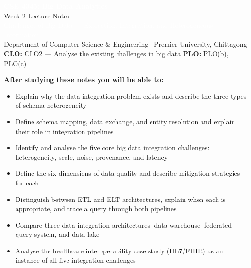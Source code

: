 \documentclass[12pt,a4paper]{article}
\begin{document}

\noindent
\colorbox{PUNavy}{%
  \begin{minipage}{\linewidth}
    \vspace{10pt}
    \begin{center}
      {\Large\bfseries\textcolor{white}{CSE 4345: Big Data Analytics}}\\[4pt]
      {\large\textcolor{PUGold}{Week 2 Lecture Notes}}\\[3pt]
      {\normalsize\textcolor{white}{Challenges of Big Data ---
        Extraction, Integration, and Heterogeneous Information}}\\[6pt]
      {\small\textcolor{PULightBlue}{Department of Computer Science \& Engineering
        \textbar\ Premier University, Chittagong}}\\[4pt]
      {\small\textcolor{PULightBlue}{\textbf{CLO:} CLO2 ---
        Analyse the existing challenges in big data \quad
        \textbf{PLO:} PLO(b), PLO(c)}}
    \end{center}
    \vspace{8pt}
  \end{minipage}%
}

\vspace{14pt}

\noindent
\colorbox{PULightBlue!70}{%
  \begin{minipage}{\dimexpr\linewidth-2\fboxsep}
    \vspace{5pt}
    \textbf{\textcolor{PUNavy}{After studying these notes you will be able to:}}
    \begin{itemize}[nosep, leftmargin=1.5em, after=\vspace{4pt}]
      \item Explain why the data integration problem exists and describe the three types of schema heterogeneity
      \item Define schema mapping, data exchange, and entity resolution and explain their role in integration pipelines
      \item Identify and analyse the five core big data integration challenges: heterogeneity, scale, noise, provenance, and latency
      \item Define the six dimensions of data quality and describe mitigation strategies for each
      \item Distinguish between ETL and ELT architectures, explain when each is appropriate, and trace a query through both pipelines
      \item Compare three data integration architectures: data warehouse, federated query system, and data lake
      \item Analyse the healthcare interoperability case study (HL7/FHIR) as an instance of all five integration challenges
    \end{itemize}
  \end{minipage}%
}
\end{document}
